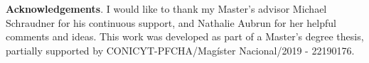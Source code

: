 \documentclass[letterpaper,10pt]{amsart}
\theoremstyle{plain}
\begin{document}
	\textbf{Acknowledgements}. I would like to thank my Master's advisor Michael Schraudner for his continuous support, and Nathalie Aubrun for her helpful comments and ideas. This work was developed as part of a Master's degree thesis, partially supported by CONICYT-PFCHA/Mag\'ister Nacional/2019 - 22190176.
	
	
	{}
\end{document}
